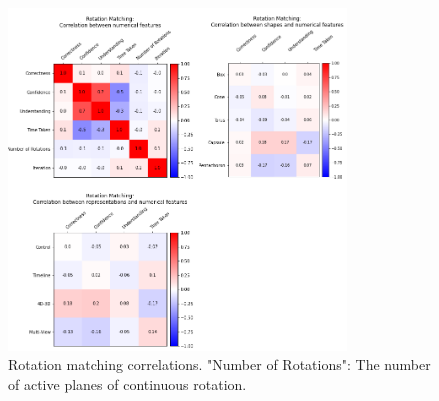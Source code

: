 \documentclass{l4proj}
\begin{document}
\begin{figure}[H]
  \centering
  \includegraphics[width=0.8\textwidth]{images/results/rotation_matching_correlations.png}
  \caption{Rotation matching correlations. "Number of Rotations": The number of active planes of continuous rotation.}
  \label{fig:rot_corr}
\end{figure}
\end{document}
